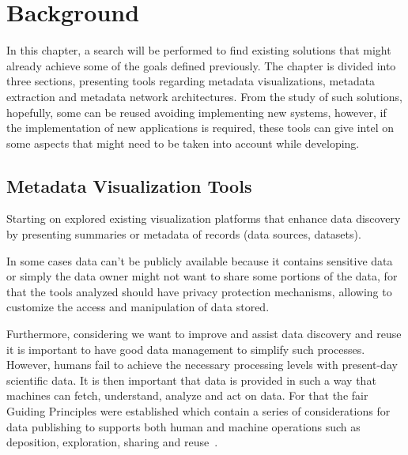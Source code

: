 \chapter{Background}
\label{chapter:background}
\graphicspath{{figs/02-background/}}

In this chapter, a search will be performed to find existing solutions that might already achieve some of the goals defined previously.
The chapter is divided into three sections, presenting tools regarding metadata visualizations, metadata extraction and metadata network architectures.
From the study of such solutions, hopefully, some can be reused avoiding implementing new systems, however, if the implementation of new applications is required, these tools can give intel on some aspects that might need to be taken into account while developing.

\section{Metadata Visualization Tools} \label{sec:viz-tools}


Starting on explored existing visualization platforms that enhance data discovery
by presenting summaries or metadata of records (data sources, datasets).

In some cases data can't be publicly available because it contains sensitive data or
simply the data owner might not want to share some portions of the data, for that the
tools analyzed should have privacy protection mechanisms, allowing to customize the
access and manipulation of data stored.

Furthermore, considering we want to improve and assist data discovery and reuse it is
important to have good data management to simplify such processes.
However, humans fail to achieve the necessary processing levels with present-day
scientific data.
It is then important that data is provided in such a way that machines can fetch,
understand, analyze and act on data.
For that the \gls{fair} Guiding Principles were established which contain a series of
considerations for data publishing to supports both human and machine operations such
as deposition, exploration, sharing and reuse~\cite{fair}.

